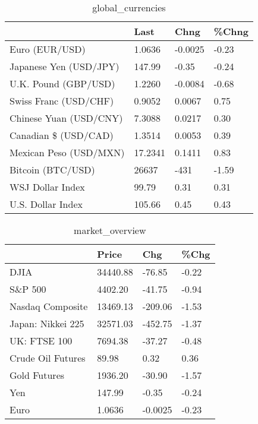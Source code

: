 \documentclass{article}%
\begin{document}
%


\begin{table}[htbp]%
\caption{global\_currencies}%
\centering%
\begin{adjustbox}{width=1\textwidth}%
\begin{tabular}{llll}
\toprule
                       &    Last &    Chng & \%Chng \\
\midrule
        Euro (EUR/USD) &  1.0636 & -0.0025 & -0.23 \\
Japanese Yen (USD/JPY) &  147.99 &   -0.35 & -0.24 \\
  U.K. Pound (GBP/USD) &  1.2260 & -0.0084 & -0.68 \\
 Swiss Franc (USD/CHF) &  0.9052 &  0.0067 &  0.75 \\
Chinese Yuan (USD/CNY) &  7.3088 &  0.0217 &  0.30 \\
  Canadian \$ (USD/CAD) &  1.3514 &  0.0053 &  0.39 \\
Mexican Peso (USD/MXN) & 17.2341 &  0.1411 &  0.83 \\
     Bitcoin (BTC/USD) &   26637 &    -431 & -1.59 \\
      WSJ Dollar Index &   99.79 &    0.31 &  0.31 \\
     U.S. Dollar Index &  105.66 &    0.45 &  0.43 \\
\bottomrule
\end{tabular}
%
\end{adjustbox}%
\end{table}

%


\begin{table}[htbp]%
\caption{market\_overview}%
\centering%
\begin{adjustbox}{width=1\textwidth}%
\begin{tabular}{llll}
\toprule
                  &    Price &     Chg &  \%Chg \\
\midrule
             DJIA & 34440.88 &  -76.85 & -0.22 \\
          S\&P 500 &  4402.20 &  -41.75 & -0.94 \\
 Nasdaq Composite & 13469.13 & -209.06 & -1.53 \\
Japan: Nikkei 225 & 32571.03 & -452.75 & -1.37 \\
     UK: FTSE 100 &  7694.38 &  -37.27 & -0.48 \\
Crude Oil Futures &    89.98 &    0.32 &  0.36 \\
     Gold Futures &  1936.20 &  -30.90 & -1.57 \\
              Yen &   147.99 &   -0.35 & -0.24 \\
             Euro &   1.0636 & -0.0025 & -0.23 \\
\bottomrule
\end{tabular}
%
\end{adjustbox}%
\end{table}

%
\end{document}
